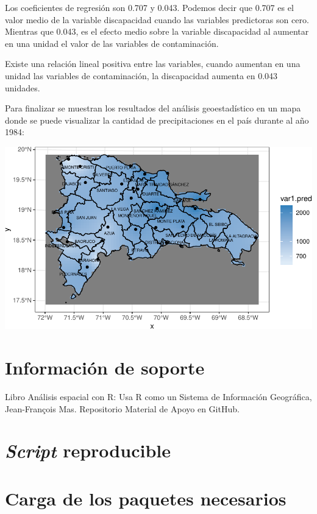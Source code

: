 \documentclass[11pt,]{article}
\begin{document}
Los coeficientes de regresión son 0.707 y 0.043. Podemos decir que 0.707
es el valor medio de la variable discapacidad cuando las variables
predictoras son cero. Mientras que 0.043, es el efecto medio sobre la
variable discapacidad al aumentar en una unidad el valor de las
variables de contaminación.

Existe una relación lineal positiva entre las variables, cuando aumentan
en una unidad las variables de contaminación, la discapacidad aumenta en
0.043 unidades.

Para finalizar se muestran los resultados del análisis geoestadístico en
un mapa donde se puede visualizar la cantidad de precipitaciones en el
país durante al año 1984:

\includegraphics{proyecto_files/figure-latex/unnamed-chunk-19-1.pdf}

\section{Información de soporte}\label{informaciuxf3n-de-soporte}

Libro Análisis espacial con R: Usa R como un Sistema de Información
Geográfica, Jean-François Mas. Repositorio Material de Apoyo en GitHub.

\section{\texorpdfstring{\emph{Script}
reproducible}{Script reproducible}}\label{script-reproducible}

\section{Carga de los paquetes
necesarios}\label{carga-de-los-paquetes-necesarios}
\end{document}
